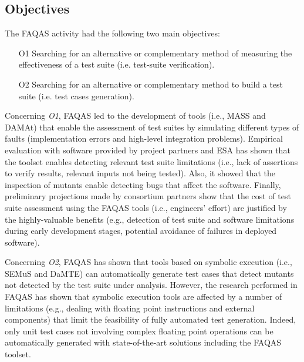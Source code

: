
\STARTCHANGEDWPT

\subsection{Objectives}

The FAQAS activity had the following two main objectives:
\begin{itemize}
\item[O1] Searching for an alternative or complementary method of measuring the effectiveness of a test suite (i.e. test-suite verification).
\item[O2] Searching for an alternative or complementary method to build a test suite (i.e. test cases generation).
\end{itemize}

Concerning \emph{O1}, FAQAS led to the development of tools (i.e., MASS and DAMAt) that enable the assessment of test suites by simulating different types of faults (implementation errors and high-level integration problems). Empirical evaluation with software provided by project partners and ESA has shown that the toolset enables detecting relevant test suite limitations (i.e., lack of assertions to verify results, relevant inputs not being tested). Also, it showed that the inspection of mutants enable detecting bugs that affect the software. Finally, preliminary projections made by consortium partners show that the cost of test suite assessment using the FAQAS tools (i.e., engineers' effort) are justified by the highly-valuable benefits (e.g., detection of test suite and software limitations during early development stages, potential avoidance of failures in deployed software).

Concerning \emph{O2}, FAQAS has shown that tools based on symbolic execution (i.e., SEMuS and DaMTE) can automatically generate test cases that detect mutants not detected by the test suite under analysis. However, the research performed in FAQAS has shown that 
symbolic execution tools
are affected by a number of limitations (e.g., dealing with floating point instructions and external components) that limit the feasibility of fully automated test generation. Indeed, only unit test cases not involving complex floating point operations can be automatically generated with state-of-the-art solutions including the FAQAS toolset.

